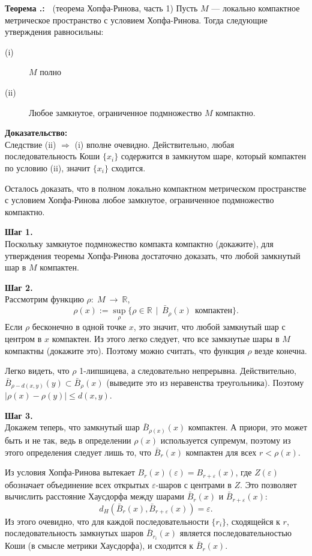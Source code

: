 \documentclass[12pt]{book}
\newcommand{\arrow}{{\:\longrightarrow\:}}
\renewcommand{\epsilon}{\varepsilon}
\def\R{{\mathbb R}}
\theoremstyle{upshape}
\theoremstyle{generic}
\theoremstyle{upshapenonumber}
\newcommand{\следствие}{%
     \refstepcounter{teorema}
     {\noindent\bf Следствие \thechapter.\arabic{teorema}:\ }}
\newcommand{\пример}{%
     \refstepcounter{teorema}
     {\noindent\bf Пример \thechapter.\arabic{teorema}:\ }}
\newcommand{\лемма}{%
     \refstepcounter{teorema}
     {\noindent\bf Лемма \thechapter.\arabic{teorema}:\ }}
\newcommand{\теорема}{%
     \refstepcounter{teorema}
     {\noindent\bf Теорема \thechapter.\arabic{teorema}:\ }}
\newcommand{\утверждение}{%
     \refstepcounter{teorema}
     {\noindent\bf Утверждение \thechapter.\arabic{teorema}:\ }}
\def\хфилл{\hfill}
\def\ноиндент{\noindent}
\def\бф{\bf}
\begin{document}
\теорема
\label{_H_R_1_Theorem_}
(теорема Хопфа-Ринова, часть 1)
Пусть $M$ --- локально компактное метрическое 
пространство с условием Хопфа-Ринова. Тогда следующие
утверждения равносильны:
\begin{description}
\item[(i)] $M$ полно
\item[(ii)] Любое замкнутое, ограниченное
подмножество $M$ компактно.
\end{description}


\ноиндент
{\бф Доказательство:}\\
Следствие (ii) $\Rightarrow$ (i) вполне очевидно.
Действительно, любая последовательность Коши $\{x_i\}$ содержится
в замкнутом шаре, который компактен по условию (ii),
значит $\{x_i\}$ сходится.

Осталось доказать, что в полном 
локально компактном метрическом пространстве с условием
Хопфа-Ринова любое замкнутое, ограниченное
подмножество компактно.

\хфилл

\ноиндент
{\бф Шаг 1.}\\
Поскольку замкнутое подмножество компакта компактно
(докажите), для утверждения теоремы Хопфа-Ринова 
достаточно доказать, что любой замкнутый шар в $M$
компактен. 

\хфилл

\ноиндент
{\бф Шаг 2.}\\
Рассмотрим функцию $\rho:\; M \arrow \R$,
\[
\rho(x):= \sup_\rho\{\rho\in \R \ \ |\ \ \bar B_\rho(x)\ \ \text{компактен}\}.
\]
Если $\rho$ бесконечно в одной точке $x$, это значит,
что любой замкнутый шар с центром в $x$ компактен.
Из этого легко следует, что все замкнутые шары в $M$
компактны (докажите это). Поэтому можно считать,
что функция $\rho$ везде конечна.

Легко видеть, что $\rho$ 1-липшицева, а следовательно
непрерывна. Действительно, 
$\bar B_{\rho-d(x,y)}(y)\subset\bar B_\rho(x)$
(выведите это из неравенства треугольника). 
Поэтому $|\rho(x)-\rho(y)| \leq d(x,y)$.

\хфилл

\ноиндент
{\бф Шаг 3.}\\
Докажем теперь, что замкнутый шар $\bar B_{\rho(x)}(x)$
компактен. А приори, это может быть и не так,
ведь в определении $\rho(x)$ используется супремум,
поэтому из этого определения следует лишь то, что
$\bar B_r(x)$ компактен для всех $r< {\rho(x)}$.

Из условия Хопфа-Ринова вытекает
$B_r(x)(\epsilon) = B_{r+\epsilon}(x)$,
где $Z(\epsilon)$ обозначает объединение
всех открытых $\epsilon$-шаров с центрами в $Z$.
Это позволяет вычислить расстояние Хаусдорфа между шарами
$\bar B_r(x)$ и $\bar B_{r+\epsilon}(x)$:
\[
  d_H(\bar B_r(x),\bar  B_{r+\epsilon}(x))=\epsilon.
\]
Из этого очевидно, что
для каждой последовательности $\{r_i\}$, сходящейся к $r$,
последовательность замкнутых шаров $\bar B_{r_i}(x)$
является последовательностью Коши (в смысле метрики
Хаусдорфа), и сходится к $\bar B_r(x)$. 
\end{document}
